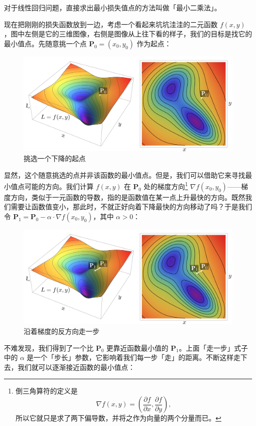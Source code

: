 \begin{note}
  对于线性回归问题，直接求出最小损失值点的方法叫做「最小二乘法」。
\end{note}

现在把刚刚的损失函数放到一边，考虑一个看起来坑坑洼洼的二元函数 $f(x,y)$，图中左侧是它的三维图像，右侧是图像从上往下看的样子，我们的目标是找它的最小值点。先随意挑一个点 $\mathbf{P}_0 = (x_0, y_0)$ 作为起点：

\begin{figure}[htb!]
  \centering
  \includegraphics[width=.7\textwidth]{assets/surpass/GD_1.png}
  \caption{挑选一个下降的起点}
  \label{fig:GD_1}
\end{figure}

显然，这个随意挑选的点并非该函数的最小值点。但是，我们可以借助它来寻找最小值点可能的方向。我们计算 $f(x,y)$ 在 $\mathbf{P}_0$ 处的梯度方向\footnote{倒三角算符的定义是\[\nabla f(x,y) = \left( \frac{\partial f}{\partial x} , \frac{\partial f}{\partial y} \right),\]所以它就只是求了两下偏导数，并将之作为向量的两个分量而已。} $\nabla f(x_0, y_0)$——梯度方向，类似于一元函数的导数，指的是函数值在某一点上升最快的方向。既然我们需要让函数值变小，那此时，不就正好向着下降最快的方向移动了吗？于是我们令 $\mathbf{P}_1 = \mathbf{P}_0 - \alpha \cdot \nabla f(x_0, y_0)$，其中 $\alpha > 0$：

\begin{figure}[htb!]
  \centering
  \includegraphics[width=.7\textwidth]{assets/surpass/GD_2.png}
  \caption{沿着梯度的反方向走一步}
  \label{fig:GD_2}
\end{figure}

不难发现，我们得到了一个比 $\mathbf{P}_0$ 更靠近函数最小值的 $\mathbf{P}_1$。上面「走一步」式子中的 $\alpha$ 是一个「步长」参数，它影响着我们每一步「走」的距离。不断这样走下去，我们就可以逐渐接近函数的最小值点：

